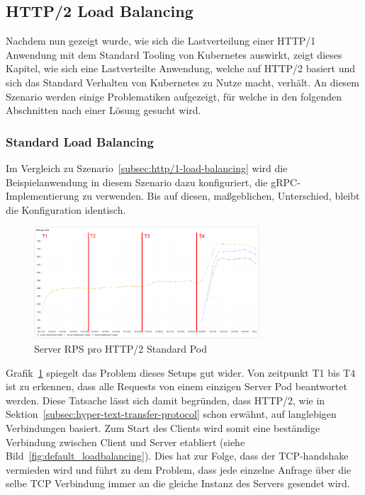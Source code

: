 \subsection{HTTP/2 Load Balancing}\label{subsec:http/2-load-balancing}

Nachdem nun gezeigt wurde, wie sich die Lastverteilung einer HTTP/1 Anwendung mit dem Standard Tooling von Kubernetes auswirkt, zeigt dieses Kapitel, wie sich eine Lastverteilte Anwendung, welche auf HTTP/2 basiert und sich das Standard Verhalten von Kubernetes zu Nutze macht, verhält.
An diesem Szenario werden einige Problematiken aufgezeigt, für welche in den folgenden Abschnitten nach einer Lösung gesucht wird.

\subsubsection{Standard Load Balancing}\label{subsubsec:standard}

Im Vergleich zu Szenario~\ref{subsec:http/1-load-balancing} wird die Beispielanwendung in diesem Szenario dazu konfiguriert, die gRPC-Implementierung zu verwenden.
Bis auf diesen, maßgeblichen, Unterschied, bleibt die Konfiguration identisch.

\begin{figure}[H]
    \centering
    \includegraphics[width=0.75\textwidth]{img/default_rps}
    \caption{Server RPS pro HTTP/2 Standard Pod}
    \label{fig:default_rps}
\end{figure}

Grafik~\ref{fig:default_rps} spiegelt das Problem dieses Setups gut wider.
Von zeitpunkt T1 bis T4 ist zu erkennen, dass alle Requests von einem einzigen Server Pod beantwortet werden.
Diese Tatsache lässt sich damit begründen, dass HTTP/2, wie in Sektion~\ref{subsec:hyper-text-transfer-protocol} schon erwähnt, auf langlebigen Verbindungen basiert.
Zum Start des Clients wird somit eine beständige Verbindung zwischen Client und Server etabliert (siehe Bild~\ref{fig:default_loadbalancing}).
Dies hat zur Folge, dass der TCP-handshake vermieden wird und führt zu dem Problem, dass jede einzelne Anfrage über die selbe TCP Verbindung immer an die gleiche Instanz des Servers gesendet wird.

